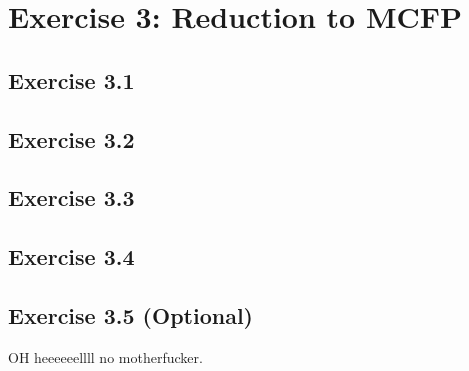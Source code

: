 \section{Exercise 3: Reduction to MCFP}
\subsection{Exercise 3.1}
\subsection{Exercise 3.2}
\subsection{Exercise 3.3}
\subsection{Exercise 3.4}
\subsection{Exercise 3.5 (Optional)}
OH heeeeeellll no motherfucker.